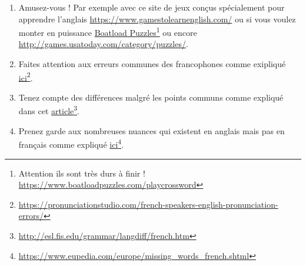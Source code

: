 \begin{enumerate}
    présentes en anglais avec ce    \href{https://www.quizz.biz/quizz-918091.html}{quizz}\footnote{\url{https://www.quizz.biz/quizz-918091.html}}.
  \item Amusez-vous ! Par exemple avec ce site de jeux conçus
    spécialement pour apprendre l'anglais
    \url{https://www.gamestolearnenglish.com/} ou si vous voulez
    monter en puissance
    \href{https://www.boatloadpuzzles.com/playcrossword}{Boatload
      Puzzles}\footnote{Attention ils sont très durs à finir !
      \url{https://www.boatloadpuzzles.com/playcrossword}} ou encore
    \url{http://games.usatoday.com/category/puzzles/}.
  \item Faites attention aux erreurs communes des francophones comme
      exipliqué    \href{https://pronunciationstudio.com/french-speakers-english-pronunciation-errors/}{ici}\footnote{\url{https://pronunciationstudio.com/french-speakers-english-pronunciation-errors/}}.
    \item Tenez compte des différences malgré les points communs
        comme expliqué dans cet        \href{http://esl.fis.edu/grammar/langdiff/french.htm}{article}\footnote{\url{http://esl.fis.edu/grammar/langdiff/french.htm}}.
      \item Prenez garde aux nombreuses nuances qui existent en
        anglais mais pas en français comme expliqué \href{https://www.eupedia.com/europe/missing_words_french.shtml}{ici}\footnote{\url{https://www.eupedia.com/europe/missing_words_french.shtml}}.
\end{enumerate}

\newpage

